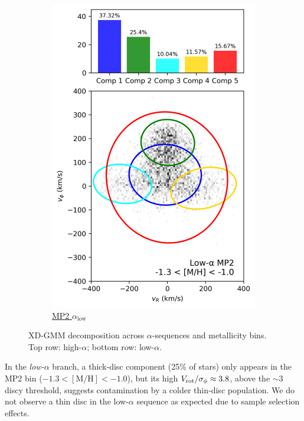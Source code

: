 \documentclass[a4paper,10pt]{article}
\begin{document}
\begin{multicols}{2}
\begin{figure}[H]
\begin{subfigure}[t]{0.24\linewidth}
    \includegraphics[width=\linewidth]{../figures/gmm_mp2_low_alpha_k6.png}
    \caption{\href{https://raw.githack.com/raunaq-rai/Disentangling-the-Milky-Way-using-GMM/main/figures/MP2\_low\_\_\_\_-1.3\%5BM\_H\%5D-1.0.html}{MP2 $\alpha_{\mathrm{low}}$}}
    \label{fig:low_mp2}
  \end{subfigure}


  \caption{XD-GMM decomposition across $\alpha$-sequences and metallicity bins. Top row: high-$\alpha$; bottom row: low-$\alpha$.}
  \label{fig:gmm_alpha_bins}
\end{figure}

In the \textit{low-$\alpha$} branch, a thick‐disc component (25\% of stars) only appears in the MP2 
bin ($-1.3<\mathrm{[M/H]}<-1.0$), but its high $V_{\rm rot}/\sigma_{\phi}\approx3.8$, above 
the $\sim3$ discy threshold, suggests contamination by a colder thin‐disc population. We do not observe
a thin disc in the low-$\alpha$ sequence as expected due to sample selection effects.



\end{multicols}
\end{document}
